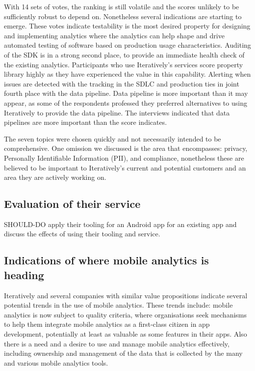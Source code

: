 With 14 sets of votes, the ranking is still volatile and the scores unlikely to be sufficiently robust to depend on. Nonetheless several indications are starting to emerge. 
These votes indicate testability is the most desired property for designing and implementing analytics where the analytics can help shape and drive automated testing of software based on production usage characteristics. Auditing of the SDK is in a strong second place, to provide an immediate health check of the existing analytics. Participants who use Iteratively's services score property library highly as they have experienced the value in this capability. Alerting when issues are detected with the tracking in the SDLC and production ties in joint fourth place with the data pipeline. Data pipeline is more important than it may appear, as some of the respondents professed they preferred alternatives to using Iteratively to provide the data pipeline. The interviews indicated that data pipelines are more important than the score indicates.

The seven topics were chosen quickly and not necessarily intended to be comprehensive. One omission we discussed is the area that encompasses: privacy, Personally Identifiable Information (PII), and compliance, nonetheless these are believed to be important to Iteratively's current and potential customers and an area they are actively working on.

\subsection{Evaluation of their service}
SHOULD-DO apply their tooling for an Android app for an existing app and discuss the effects of using their tooling and service. %

\subsection{Indications of where mobile analytics is heading}
Iteratively and several companies with similar value propositions indicate several potential trends in the use of mobile analytics. These trends include: mobile analytics is now subject to quality criteria, where organisations seek mechanisms to help them integrate mobile analytics as a first-class citizen in app development, potentially at least as valuable as some features in their apps. Also there is a need and a desire to use and manage mobile analytics effectively, including ownership and management of the data that is collected by the many and various mobile analytics tools. 

